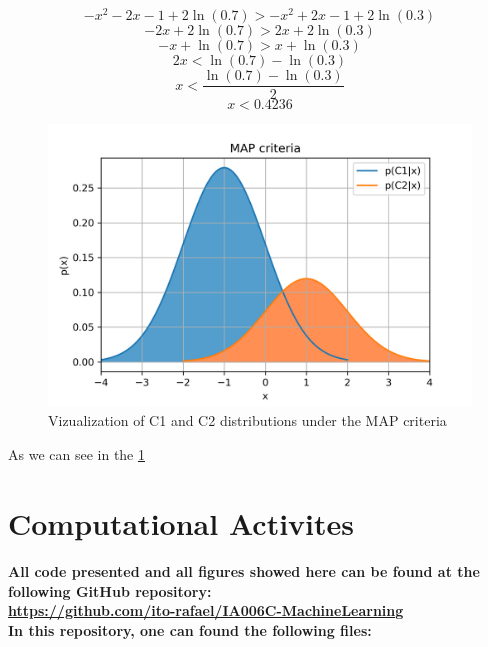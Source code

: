 \documentclass[a4paper]{article}
\begin{document}
$$ -x^2-2x-1 + 2\ln(0.7) > -x^2+2x-1 + 2\ln(0.3)    $$
$$ -2x + 2\ln(0.7) > 2x + 2\ln(0.3)                 $$
$$ -x + \ln(0.7) > x + \ln(0.3)                     $$
$$ 2x  < \ln(0.7) - \ln(0.3)                        $$
$$ x  < \frac{\ln(0.7) - \ln(0.3)}{2}               $$
$$ \boxed{x  < 0.4236}                              $$

\begin{figure}[h]
    \centering
    \includegraphics[width=12cm]{MAP}
    \caption{Vizualization of C1 and C2 distributions under the MAP criteria}
    \label{fig:MAP}
\end{figure}

As we can see in the \ref{fig:MAP}

\section{Computational Activites}

\paragraph{
All code presented and all figures showed here can be found at the following GitHub repository:\\
\url{https://github.com/ito-rafael/IA006C-MachineLearning}\\
In this repository, one can found the following files:\\
}
\end{document}
